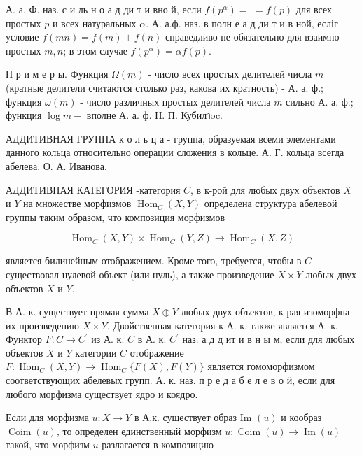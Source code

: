 \documentclass[10pt]{article}
\begin{document}
А. а. Ф. наз. с и ль н о а д ди т и вно й, если $f\left(p^{\alpha}\right)=$ $=f(p)$ для всех простых $p$ и всех натуральных $\alpha$. А. а.ф. наз. в полн е а д ди т и в ной, есліг условие $f(m n)=f(m)+f(n)$ справедливо не обязательно для взаимно простых $m, n$; в этом случае $f\left(p^{\alpha}\right)=\alpha f(p)$.



П р и м е р ы. Функция $\Omega(m)$ - число всех простых делителей числа $m$ (кратные делители считаются столько раз, какова их кратность) - А. а. ф.; функция $\omega(m)$ - число различных простых делителей числа $m$ сильно А. а. ф.; функция $\log m-$ вполне А. а. ф. Н. П. Кубилาoc.



АДДИТИВНАЯ ГРУППА к о л ь ц а - группа, образуемая всеми элементами данного кольца относительно операции сложения в кольце. А. Г. кольца всегда абелева. О. А. Иванова.



АДДИТИВНАЯ КАТЕГОРИЯ -категория $C$, в к-рой для любых двух объектов $X$ и $Y$ на множестве морфизмов $\operatorname{Hom}_{C}(X, Y)$ определена структура абелевой группы таким образом, что композиция морфизмов



\[

\operatorname{Hom}_{C}(X, Y) \times \operatorname{Hom}_{C}(Y, Z) \longrightarrow \operatorname{Hom}_{C}(X, Z)

\]



является билинейным отображением. Кроме того, требуется, чтобы в $C$ существовал нулевой объект (или нуль), а также произведение $X \times Y$ любых двух объектов $X$ и $Y$.



В А. к. существует прямая сумма $X \oplus Y$ любых двух объектов, к-рая изоморфна их произведению $X \times Y$. Двойственная категория к А. к. также является А. к. Функтор $F: C \rightarrow C^{\prime}$ из А. к. $C$ в А. к. $C^{\prime}$ наз. а д д ит и в н ы м, если для любых объектов $X$ и $Y$ категории $C$ отображение $F: \operatorname{Hom}_{C}(X, Y) \rightarrow \operatorname{Hom}_{C}\{F(X), F(Y)\}$ является гомоморфизмом соответствующих абелевых групп. А. к. наз. п р е д а б е л е в о й, если для любого морфизма существует ядро и коядро.



Если для морфизма $u: X \rightarrow Y$ в А.к. существует образ Im $(u)$ и кообраз $\operatorname{Coim}(u)$, то определен единственный морфизм $u: \operatorname{Coim}(u) \rightarrow \operatorname{Im}(u)$ такой, что морфизм $u$ разлагается в композицию
\end{document}
